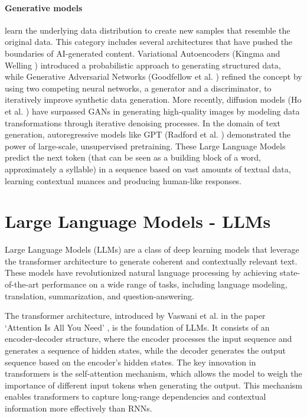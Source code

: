 \paragraph{Generative models}
learn the underlying data distribution to create new samples that resemble the
original data. This category includes several architectures that have pushed the
boundaries of AI-generated content. Variational Autoencoders (Kingma and Welling
\cite{kingma2022autoencodingvariationalbayes}) introduced a probabilistic
approach to generating structured data, while Generative Adversarial Networks (Goodfellow
et al. \cite{goodfellow2014generativeadversarialnetworks}) refined the concept
by using two competing neural networks, a generator and a discriminator, to
iteratively improve synthetic data generation. More recently, diffusion models (Ho
et al. \cite{ho2020denoisingdiffusionprobabilisticmodels}) have surpassed GANs in
generating high-quality images by modeling data transformations through iterative
denoising processes. In the domain of text generation, autoregressive models like
GPT (Radford et al. \cite{radford2018improving}) demonstrated the power of large-scale,
unsupervised pretraining. These Large Language Models predict the next token (that
can be seen as a building block of a word, approximately a syllable) in a sequence
based on vast amounts of textual data, learning contextual nuances and producing
human-like responses.

\section{Large Language Models - LLMs}
\label{sec:large_language_models_llms}

Large Language Models (LLMs) are a class of deep learning models that leverage the
transformer architecture to generate coherent and contextually relevant text.
These models have revolutionized natural language processing by achieving state-of-the-art
performance on a wide range of tasks, including language modeling, translation, summarization,
and question-answering.

The transformer architecture, introduced by Vaswani et al. in the paper `Attention
Is All You Need' \cite{vaswani2023attentionneed}, is the foundation of LLMs. It
consists of an encoder-decoder structure, where the encoder processes the input sequence
and generates a sequence of hidden states, while the decoder generates the
output sequence based on the encoder's hidden states. The key innovation in transformers
is the self-attention mechanism, which allows the model to weigh the importance
of different input tokens when generating the output. This mechanism enables transformers
to capture long-range dependencies and contextual information more effectively than
RNNs.

